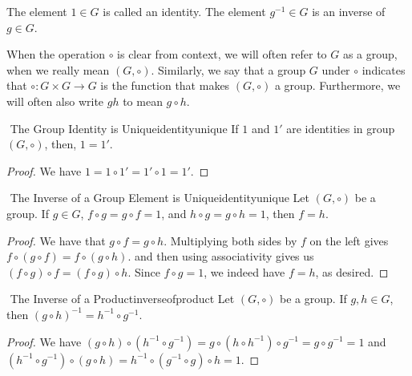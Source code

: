     \begin{remark*}
        The element \(1\in G\) is called an identity. The element \(g^{-1}\in G\) is an inverse of \(g\in G\).
    \end{remark*}
    \begin{remark*}
        When the operation \(\circ\) is clear from context, we will often refer to \(G\) as a group, when we really mean \((G,\circ)\). Similarly, we say that a group \(G\) under \(\circ\) indicates that \(\circ:G\times G\to G\) is the function that makes \((G,\circ)\) a group. Furthermore, we will often also write \(gh\) to mean \(g\circ h\).
    \end{remark*}
    \begin{proposition}{\Stop\,\,The Group Identity is Unique}{identityunique}
        If \(1\) and \(1'\) are identities in group \((G,\circ)\), then, \(1=1'\).
        \begin{proof}
            We have \(1=1\circ 1'=1'\circ 1=1'\).
        \end{proof}
    \end{proposition}
    \begin{proposition}{\Stop\,\,The Inverse of a Group Element is Unique}{identityunique}
        Let \((G,\circ)\) be a group. If \(g\in G\), \(f\circ g=g\circ f=1\), and \(h\circ g=g\circ h=1\), then \(f=h\).
        \begin{proof}
            We have that \(g\circ f=g\circ h\). Multiplying both sides by \(f\) on the left gives \(f\circ (g\circ f)=f\circ (g\circ h)\).
            and then using associativity gives us \((f\circ g)\circ f=(f\circ g)\circ h\). Since \(f\circ g=1\), we indeed have \(f=h\), as desired.
        \end{proof}
    \end{proposition}
    \begin{proposition}{\Stop\,\,The Inverse of a Product}{inverseofproduct}
        Let \((G,\circ)\) be a group. If \(g,h\in G\), then \((g\circ h)^{-1}=h^{-1}\circ g^{-1}\).
        \begin{proof}
            We have \((g\circ h)\circ (h^{-1}\circ g^{-1})=g\circ(h\circ h^{-1})\circ g^{-1}=g\circ g^{-1}=1\) and \((h^{-1}\circ g^{-1})\circ (g\circ h)=h^{-1}\circ(g^{-1}\circ g)\circ h=1\).
        \end{proof}
    \end{proposition}
